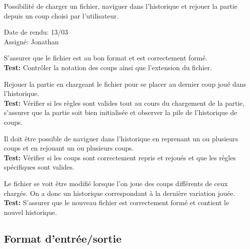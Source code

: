 \documentclass{article}
\begin{document}
\begin{needbox}
    Possibilité de charger un fichier, naviguer dans l'historique et rejouer la partie depuis un coup choisi par l'utilisateur.
    \begin{duedatebox}
        Date de rendu: 13/03\\
        Assigné: Jonathan
    \end{duedatebox}
    \begin{subneedbox}
        S'assurer que le fichier est au bon format et est correctement formé.\\
        \textbf{Test:} Contrôler la notation des coups ainsi que l'extension du fichier.
    \end{subneedbox}
    \begin{subneedbox}
        Rejouer la partie en chargeant le fichier pour se placer au dernier coup joué dans l'historique.\\
        \textbf{Test:} Vérifier si les règles sont valides tout au cours du chargement de la partie, s'assurer
        que la partie soit bien initialisée et observer la pile de l'historique de coups.
    \end{subneedbox}
    \begin{subneedbox}
        Il doit être possible de naviguer dans l'historique en reprenant un ou plusieurs coups et en rejouant
        un ou plusieurs coups.\\
        \textbf{Test:} Vérifier si les coups sont correctement repris et rejoués et que les règles spécifiques sont valides.
    \end{subneedbox}
    \begin{subneedbox}
        Le fichier se voit être modifié lorsque l'on joue des coups différents de ceux chargés. On a donc un historique correspondant
        à la dernière variation jouée.\\
        \textbf{Test:} S'assurer que le nouveau fichier est correctement formé et contient le nouvel historique.
    \end{subneedbox}
\end{needbox}

\subsection{Format d'entrée/sortie}
\end{document}
